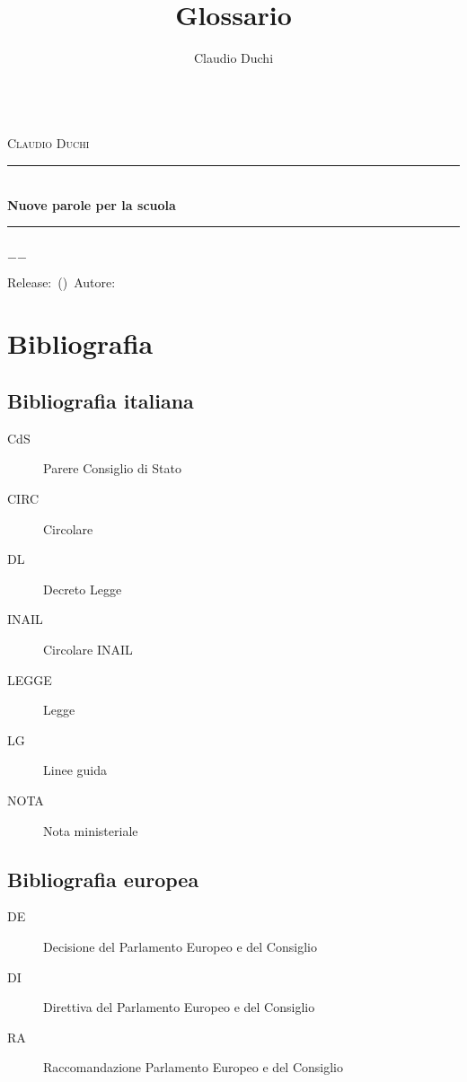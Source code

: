 \documentclass[a4paper,oneside]{book}%
\title{Glossario}
\author{Claudio Duchi}
\date{\datetime}
\makeatletter
\newcommand{\HRule}{\rule{\linewidth}{0.5mm}}
\renewcommand\frontmatter{%
	\cleardoublepage
	\@mainmatterfalse
	\pagenumbering{arabic}}
\renewcommand\mainmatter{%
	\cleardoublepage
	\@mainmattertrue}
\makeatother
\begin{document}
	\pagestyle{fancy}
	\fncyfront
	\frontmatter
		\hypersetup{pageanchor=false}
		\begin{titlepage}\parindent=0pt
			\centering
	\begin{center}
	\Lgrandedue\\[1cm]
	\textsc{\LARGE Claudio Duchi}\\[1.2cm]
	\HRule \\[0.4cm]
	{ \huge \bfseries Nuove parole per la scuola}\\[0.4cm]
	\HRule \\[1.2cm]
	\vfill
	{\large $-$\DTMnow$-$}	
\end{center}
{\centering
	Release:\gitReln\ (\gitAbbrevHash)\ Autore:\gitAuthorName\ 
	\gitCommitterDate \\
}
		\end{titlepage}
	\setcounter{page}{2}
		\CDcopyright
		\listoftables
		\tableofcontents
			
	\fncymain
	\mainmatter
\cleardoublepage
\glsaddall	
\printglossaries
	
\nocite{*}
\chapter*{Bibliografia}
 \section*{Bibliografia italiana}
 \begin{description}
 	\item[CdS] Parere Consiglio di Stato
 	\item[CIRC] Circolare 
 	\item[DL] Decreto Legge
 	\item[INAIL] Circolare INAIL
 	\item[LEGGE] Legge
 	\item[LG] Linee guida
 	\item[NOTA] Nota ministeriale
 \end{description}
\printbibliography[keyword=LEX,heading=subbibliography]
 \section*{Bibliografia europea}
 \begin{description}
 	\item[DE] Decisione del Parlamento Europeo e del Consiglio
 	\item[DI] Direttiva del Parlamento Europeo e del Consiglio
 	\item[RA] Raccomandazione Parlamento Europeo e del Consiglio
 \end{description}
\printbibliography[keyword=EU,heading=subbibliography]
\end{document}
